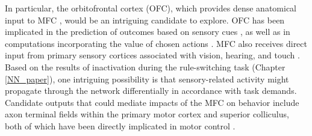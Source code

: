 In particular, the orbitofrontal cortex (OFC), which provides dense anatomical input to MFC \citep{reep1984afferent,reep1999topographic}, would be an intriguing candidate to explore. OFC has been implicated in the prediction of outcomes based on sensory cues \citep{ostlund2009evidence,schoenbaum2011does}, as well as in computations incorporating the value of chosen actions \citep{sul2010distinct}. MFC also receives direct input from primary sensory cortices associated with vision, hearing, and touch \citep{reep1999topographic,barthas2017secondary}. Based on the results of inactivation during the rule-switching task (Chapter \ref{NN_paper}), one intriguing possibility is that sensory-related activity might propagate through the network differentially in accordance with task demands. Candidate outputs that could mediate impacts of the MFC on behavior include axon terminal fields within the primary motor cortex and superior colliculus, both of which have been directly implicated in motor control \citep{donoghue1982motor,gandhi2011motor}.   
